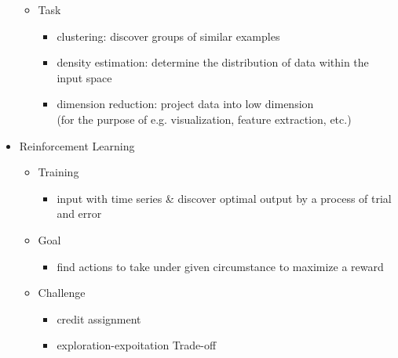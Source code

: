 \begin{itemize}
\begin{itemize}
	\item Task
		\begin{itemize}
		\item clustering: discover groups of similar examples
		\item density estimation: determine the distribution of data within the input space
		\item dimension reduction: project data into low dimension \\
		(for the purpose of e.g. visualization, feature extraction, etc.)
		\end{itemize}
	\end{itemize}
\item Reinforcement Learning
	\begin{itemize}
	\item Training
		\begin{itemize}
		\item input with time series \& discover optimal output by a process of trial and error
		\end{itemize}
	\item Goal
		\begin{itemize}
		\item find actions to take under given circumstance to maximize a reward
		\end{itemize}
	\item Challenge
		\begin{itemize}
		\item credit assignment
		\item exploration-expoitation Trade-off
		\end{itemize}
	\end{itemize}
\end{itemize}
